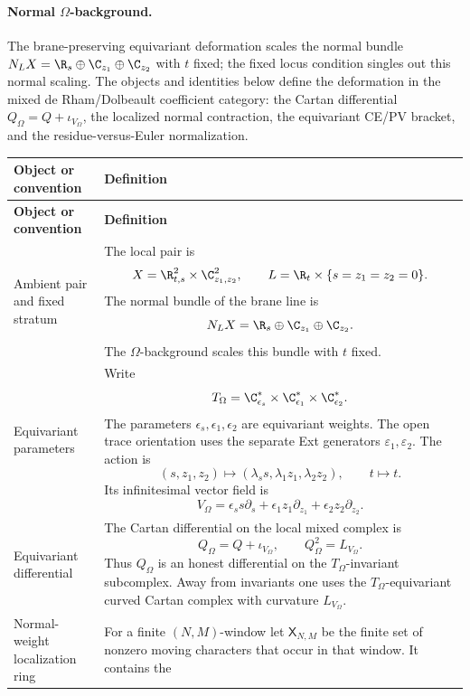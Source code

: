 \paragraph{\texorpdfstring{Normal \(\Omega\)-background.}{Normal -background}}
The brane-preserving equivariant deformation scales the normal bundle
\(N_LX=\R_s\oplus\C_{z_1}\oplus\C_{z_2}\) with \(t\) fixed; the fixed
locus condition singles out this normal scaling.  The
objects and identities below define the deformation in the mixed de
Rham/Dolbeault coefficient category: the Cartan differential
\(Q_\Omega=Q+\iota_{V_\Omega}\), the localized normal contraction, the
equivariant CE/PV bracket, and the residue-versus-Euler normalization.
\begin{longtable}{@{}>{\raggedright\arraybackslash}p{}
  >{\raggedright\arraybackslash}p{}@{}}
\hline
\textbf{Object or convention} & \textbf{Definition}\\
\hline
\endfirsthead
\hline
\textbf{Object or convention} & \textbf{Definition}\\
\hline
\endhead
Ambient pair and fixed stratum &
The local pair is
\[
  X=\R^2_{t,s}\times\C^2_{z_1,z_2},\qquad
  L=\R_t\times\{s=z_1=z_2=0\}.
\]
The normal bundle of the brane line is
\[
  N_LX=\R_s\oplus\C_{z_1}\oplus\C_{z_2}.
\]
The \(\Omega\)-background scales this bundle with \(t\) fixed.\\
\hline
Equivariant parameters &
Write
\[
  T_\Omega
  =\C^*_{\epsilon_s}\times
   \C^*_{\epsilon_1}\times
   \C^*_{\epsilon_2}.
\]
The parameters \(\epsilon_s,\epsilon_1,\epsilon_2\) are equivariant
weights.  The open trace orientation uses the separate Ext generators
\(\varepsilon_1,\varepsilon_2\).
The action is
\[
  (s,z_1,z_2)\mapsto
  (\lambda_s s,\lambda_1z_1,\lambda_2z_2),
  \qquad t\mapsto t .
\]
Its infinitesimal vector field is
\[
  V_\Omega
  =
  \epsilon_s s\partial_s
  +\epsilon_1 z_1\partial_{z_1}
  +\epsilon_2 z_2\partial_{z_2}.
\]\\
\hline
Equivariant differential &
The Cartan differential on the local mixed complex is
\[
  Q_\Omega=Q+\iota_{V_\Omega},\qquad
  Q_\Omega^2=L_{V_\Omega}.
\]
Thus \(Q_\Omega\) is an honest differential on the
\(T_\Omega\)-invariant subcomplex.  Away from invariants one uses the
\(T_\Omega\)-equivariant curved Cartan complex with
curvature \(L_{V_\Omega}\).\\
\hline
Normal-weight localization ring &
For a finite \((N,M)\)-window let \(\mathsf X_{N,M}\) be the finite set
of nonzero moving characters that occur in that window.  It contains the

\end{longtable}
